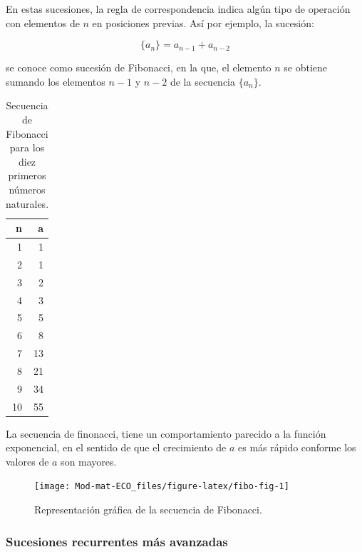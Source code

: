 \documentclass[
]{book}
\begin{document}
En estas sucesiones, la regla de correspondencia indica algún tipo de operación con elementos de \(n\) en posiciones previas. Así por ejemplo, la sucesión:

\begin{equation}
\{a_n\} = a_{n-1} + a_{n-2} \label{eq:fibonacci}
\end{equation}

se conoce como sucesión de Fibonacci, en la que, el elemento \(n\) se obtiene sumando los elementos \(n-1\) y \(n-2\) de la secuencia \(\{a_n\}\).

\begin{table}

\caption{\label{tab:fibo-tabla}Secuencia de Fibonacci para los diez primeros números naturales.}
\centering
\begin{tabular}[t]{r|r}
\hline
n & a\\
\hline
1 & 1\\
\hline
2 & 1\\
\hline
3 & 2\\
\hline
4 & 3\\
\hline
5 & 5\\
\hline
6 & 8\\
\hline
7 & 13\\
\hline
8 & 21\\
\hline
9 & 34\\
\hline
10 & 55\\
\hline
\end{tabular}
\end{table}

La secuencia de finonacci, tiene un comportamiento parecido a la función exponencial, en el sentido de que el crecimiento de \(a\) es más rápido conforme los valores de \(a\) son mayores.

\begin{figure}

{\centering \texttt{[image: Mod-mat-ECO\_files/figure-latex/fibo-fig-1]} 

}

\caption{Representación gráfica de la secuencia de Fibonacci.}\label{fig:fibo-fig}
\end{figure}

\hypertarget{sucesiones-recurrentes-muxe1s-avanzadas}{%
\subsubsection{Sucesiones recurrentes más avanzadas}\label{sucesiones-recurrentes-muxe1s-avanzadas}}
\end{document}
